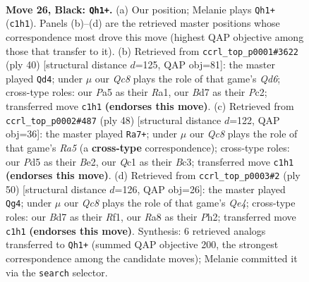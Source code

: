 \documentclass[11pt]{article}
\begin{document}
\clearpage

\begin{figure}[p]\centering
\begin{subfigure}{0.46\textwidth}\centering
\resizebox{\linewidth}{!}{%
\newchessgame
\chessboard[
  setfen={r3r3/1ppb2kp/5p2/p2p2b1/6P1/NPB1PK2/P4P2/RNq5 b - - 0 26},
  showmover=false,
  pgfstyle=straightmove, color=movearrow, markmove={c1-h1}
]}
\caption{}
\end{subfigure}\hfill
\begin{subfigure}{0.46\textwidth}\centering
\resizebox{\linewidth}{!}{%
\newchessgame
\chessboard[
  setfen={4k2r/1b1n1ppp/r2Qp3/2n5/pR6/8/PPP3PP/R6K w k - 1 21},
  showmover=false,
  pgfstyle=straightmove, color=movearrow, markmove={d6-d4}
]}
\caption{}
\end{subfigure}
\\[4pt]
\begin{subfigure}{0.46\textwidth}\centering
\resizebox{\linewidth}{!}{%
\newchessgame
\chessboard[
  setfen={4r3/2kn1p2/2pr1npp/Rp1b2N1/5P2/1PB1P3/1P2BK1P/R7 w - - 2 25},
  showmover=false,
  pgfstyle=straightmove, color=movearrow, markmove={a5-a7}
]}
\caption{}
\end{subfigure}\hfill
\begin{subfigure}{0.46\textwidth}\centering
\resizebox{\linewidth}{!}{%
\newchessgame
\chessboard[
  setfen={5r1k/4rnp1/pq1b3p/1p5B/3pQ3/1P6/PB4PP/R4R1K w - - 2 26},
  showmover=false,
  pgfstyle=straightmove, color=movearrow, markmove={e4-g4}
]}
\caption{}
\end{subfigure}
\caption{\textbf{Move 26, Black: \texttt{Qh1+}.} (a) Our position; Melanie plays \texttt{Qh1+} (\texttt{c1h1}). Panels (b)--(d) are the retrieved master positions whose correspondence most drove this move (highest QAP objective among those that transfer to it). (b) Retrieved from \texttt{ccrl\_top\_p0001\#3622} (ply 40) [structural distance $d$=125, QAP obj=81]: the master played \texttt{Qd4}; under $\mu$ our \emph{Qc8} plays the role of that game's \emph{Qd6}; cross-type roles: our \emph{P}a5 as their \emph{R}a1, our \emph{B}d7 as their \emph{P}c2; transferred move \texttt{c1h1} \textbf{(endorses this move)}. (c) Retrieved from \texttt{ccrl\_top\_p0002\#487} (ply 48) [structural distance $d$=122, QAP obj=36]: the master played \texttt{Ra7+}; under $\mu$ our \emph{Qc8} plays the role of that game's \emph{Ra5} (a \textbf{cross-type} correspondence); cross-type roles: our \emph{P}d5 as their \emph{B}e2, our \emph{Q}c1 as their \emph{B}c3; transferred move \texttt{c1h1} \textbf{(endorses this move)}. (d) Retrieved from \texttt{ccrl\_top\_p0003\#2} (ply 50) [structural distance $d$=126, QAP obj=26]: the master played \texttt{Qg4}; under $\mu$ our \emph{Qc8} plays the role of that game's \emph{Qe4}; cross-type roles: our \emph{B}d7 as their \emph{R}f1, our \emph{R}a8 as their \emph{P}h2; transferred move \texttt{c1h1} \textbf{(endorses this move)}. Synthesis: 6 retrieved analogs transferred to \texttt{Qh1+} (summed QAP objective 200, the strongest correspondence among the candidate moves); Melanie committed it via the \texttt{search} selector.}
\label{fig:thought-m51}
\end{figure}
\end{document}
